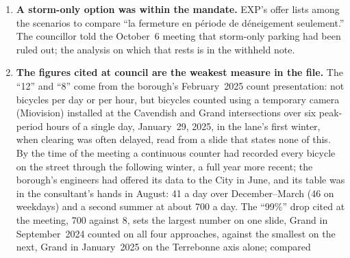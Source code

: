 \documentclass[11pt,letterpaper]{article}
\begin{document}
\begin{enumerate}[nosep]
\begin{minipage}[t]{\linewidth}
{    mandate from the mayor's office was permanent.} On August~13 the borough
    mayor's chief of staff set the mandate in writing: a bidirectional lane
    on one side of Terrebonne, from Loyola to C\^ote-Saint-Luc, ``qui
    respecte les normes minimales pr\'evues par la loi,'' and ``le retour du
    stationnement d'un c\^ot\'e de la rue.'' No winter measure appears. The
    service request a week later added Volet~1, removal of cycling
    facilities in winter, as ``mesure transitoire pour l'hiver
    2026--2027,'' ahead of Volet~2, the permanent bidirectional lane. The
    winter conversion announced on October~6 is the first step of a
    year-round reduction of cycling space that has not been put to the
    public.\end{minipage}\vspace{0.35em}
\item \begin{minipage}[t]{\linewidth}\textbf{A storm-only option was within the mandate.} EXP's offer
    lists among the scenarios to compare ``la fermeture en p\'eriode de
    d\'eneigement seulement.'' The councillor told the October~6 meeting that
    storm-only parking had been ruled out; the analysis on which that rests
    is in the withheld note.\end{minipage}\vspace{0.35em}
\item \begin{minipage}[t]{\linewidth}\textbf{The figures cited at council are the weakest measure in
    the file.} The ``12'' and ``8'' come from the borough's February~2025
    count presentation: not bicycles per day or per hour, but bicycles
    counted using a temporary camera (Miovision) installed at the Cavendish
    and Grand intersections over six
    peak-period hours of a single day, January~29, 2025, in the lane's first
    winter, when clearing was often delayed, read from a slide that states
    none of this. By the time of the meeting a continuous counter had
    recorded every bicycle on the street through the following winter, a
    full year more recent; the borough's engineers had offered its data to
    the City in June, and its table was in the consultant's hands in
    August: 41 a day over December--March (46 on weekdays) and a second
    summer at about 700 a day. The ``99\%'' drop cited at the meeting, 700
    against 8, sets the largest number on one slide, Grand in
    September~2024 counted on all four approaches, against the smallest on
    the next, Grand in January~2025 on the Terrebonne axis alone; compared

\end{minipage}
\end{enumerate}
\end{document}
